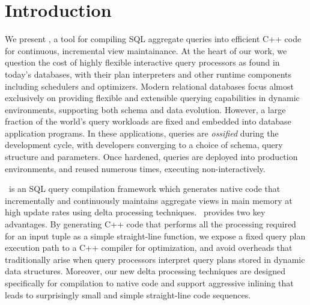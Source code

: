 \section{Introduction}


We present \compiler, a tool for compiling SQL aggregate queries into efficient
C++ code for continuous, incremental view maintainance.
%
At the heart of our work, we question the cost of highly flexible interactive
query processors as found in today's databases, with their plan interpreters and
other runtime components including schedulers and optimizers. Modern relational
databases focus almost exclusively on providing flexible and extensible querying
capabilities in dynamic environments, supporting both schema and data evolution.
%
However, a large fraction of the world's query workloads are fixed and embedded
into database application programs. In these applications, queries are
\textit{ossified} during the development cycle, with developers converging to a
choice of schema, query structure and parameters. Once hardened, queries are
deployed into production environments, and re\-used numerous times, executing
non-interactively.




\compiler\ is an SQL query  compilation framework  which generates native code
that incrementally  and continuously maintains aggregate views in main memory
at high update rates using delta processing techniques. \compiler\ provides
two key advantages.
%
By generating C++  code that  performs all the  processing required  for an
input  tuple as  a simple  straight-line function,  we expose  a fixed
query plan execution path to  a C++ compiler for optimization, and avoid
overheads that traditionally arise when query processors interpret
query plans stored in dynamic data structures.
%
Moreover, our new delta processing techniques are designed specifically for
compilation to native code and support aggressive inlining that leads to
surprisingly small and simple straight-line code sequences.

